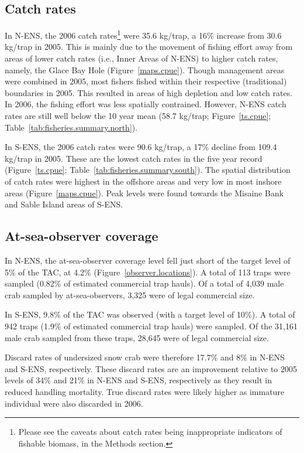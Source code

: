 \documentclass[11pt]{article}
\begin{document}
\subsection{Catch rates}

In N-ENS, the 2006 catch rates\footnote{Please see the caveats about catch rates being inappropriate indicators of fishable biomass, in the Methods section.} were 35.6 kg/trap, a 16\% increase from 30.6 kg/trap in 2005. This is mainly due to the movement of fishing effort away from areas of lower catch rates (i.e., Inner Areas of N-ENS) to higher catch rates, namely, the Glace Bay Hole (Figure~\ref{maps.cpue}). Though management areas were combined in 2005, most fishers fished within their respective (traditional) boundaries in 2005. This resulted in areas of high depletion and low catch rates. In 2006, the fishing effort was less spatially contrained. However, N-ENS catch rates are still well below the 10 year mean (58.7 kg/trap; Figure~\ref{ts.cpue}; Table~\ref{tab:fisheries.summary.north}). 

In S-ENS, the 2006 catch rates were 90.6 kg/trap, a 17\% decline from 109.4 kg/trap in 2005. These are the lowest catch rates in the five year record (Figure~\ref{ts.cpue}; Table~\ref{tab:fisheries.summary.south}). The spatial distribution of catch rates were highest in the offshore areas and very low in most inshore areas (Figure~\ref{maps.cpue}). Peak levels were found towards the Misaine Bank and Sable Island areas of S-ENS. 


\subsection{At-sea-observer coverage}

In N-ENS, the at-sea-observer coverage level fell just short of the target level of 5\% of the TAC, at 4.2\% (Figure~\ref{observer.locations}). A total of 113 traps were sampled (0.82\% of estimated commercial trap hauls). Of a total of 4,039 male crab sampled by at-sea-observers, 3,325 were of legal commercial size. 

In S-ENS, 9.8\% of the TAC was observed (with a target level of 10\%). A total of 942 traps (1.9\% of estimated commercial trap hauls) were sampled. Of the 31,161 male crab sampled from these traps, 28,645 were of legal commercial size.

Discard rates of undersized snow crab were therefore 17.7\% and 8\% in N-ENS and S-ENS, respectively. These discard rates are an improvement relative to 2005 levels of 34\% and 21\% in  N-ENS and S-ENS, respectively as they result in reduced handling mortality. True discard rates were likely higher as immature individual were also discarded in 2006.
\end{document}
